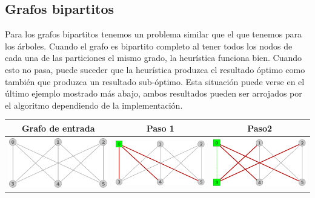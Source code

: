\subsection{Grafos bipartitos}
	Para los grafos bipartitos tenemos un problema similar que el que tenemos para los \'arboles.
	Cuando el grafo es bipartito completo al tener todos los nodos de cada una de las particiones
	el mismo grado, la heur\'istica funciona bien. Cuando esto no pasa, puede suceder que la 
	heur\'istica produzca el resultado \'optimo como tambi\'en que produzca un resultado sub-\'optimo.
	Esta situaci\'on puede verse en el \'ultimo ejemplo mostrado m\'as abajo, ambos resultados pueden
	ser arrojados por el algoritmo dependiendo de la implementaci\'on.
	\begin{center}
		\begin{tabular}{ |c||c||c| }
			\hline
			Grafo de entrada & Paso 1 & Paso2 \\
			\hline\hline
			\includegraphics[scale = 0.2]{img/ej3/constructiva_golosa/k3,3_st0.png} &
			\includegraphics[scale = 0.2]{img/ej3/constructiva_golosa/k3,3_st1.png} &
			\includegraphics[scale = 0.2]{img/ej3/constructiva_golosa/k3,3_st2.png} \\

\end{tabular}
\end{center}
